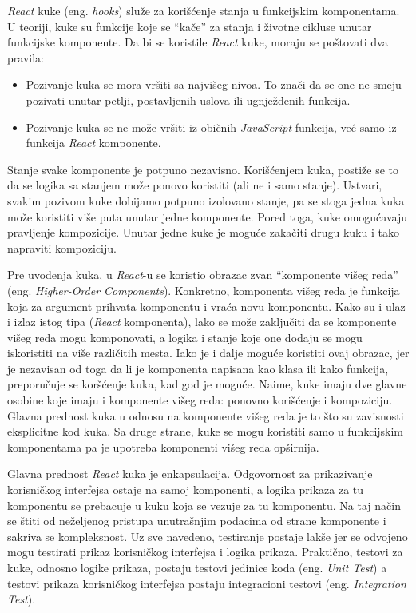 \textit{React} kuke (eng. \textit{hooks}) služe za korišćenje stanja u funkcijskim komponentama. U teoriji, kuke su funkcije 
koje se “kače” za stanja i životne cikluse unutar funkcijske komponente. Da bi se koristile \textit{React} kuke, moraju se 
poštovati dva pravila:
\begin{itemize}
    \item Pozivanje kuka se mora vršiti sa najvišeg nivoa. To znači da se one ne smeju pozivati unutar petlji, 
    postavljenih uslova ili ugnježdenih funkcija.
    \item Pozivanje kuka se ne može vršiti iz običnih \textit{JavaScript} funkcija, već samo iz funkcija \textit{React} komponente.
\end{itemize}

Stanje svake komponente je potpuno nezavisno. Korišćenjem kuka, postiže se to da se logika sa stanjem može ponovo koristiti 
(ali ne i samo stanje). Ustvari, svakim pozivom kuke dobijamo potpuno izolovano stanje, pa se stoga jedna kuka može koristiti 
više puta unutar jedne komponente. Pored toga, kuke omogućavaju pravljenje kompozicije. Unutar jedne kuke je moguće zakačiti 
drugu kuku i tako napraviti kompoziciju. 

Pre uvođenja kuka, u \textit{React}-u se koristio obrazac zvan “komponente višeg reda” (eng. \textit{Higher-Order Components}). 
Konkretno, komponenta višeg reda je funkcija koja za argument prihvata komponentu i vraća novu komponentu. Kako su i ulaz i 
izlaz istog tipa (\textit{React} komponenta), lako se može zaključiti da se komponente višeg reda mogu komponovati, a logika i 
stanje koje one dodaju se mogu iskoristiti na više različitih mesta. Iako je i dalje moguće koristiti ovaj obrazac, jer je 
nezavisan od toga da li je komponenta napisana kao klasa ili kako funkcija, preporučuje se koršćenje kuka, kad god je moguće. 
Naime, kuke imaju dve glavne osobine koje imaju i komponente višeg reda: ponovno korišćenje i kompoziciju. Glavna prednost kuka 
u odnosu na komponente višeg reda je to što su zavisnosti eksplicitne kod kuka. Sa druge strane, kuke se mogu koristiti samo u 
funkcijskim komponentama pa je upotreba komponenti višeg reda opširnija.

Glavna prednost \textit{React} kuka je enkapsulacija. Odgovornost za prikazivanje korisničkog interfejsa ostaje na samoj 
komponenti, a logika prikaza za tu komponentu se prebacuje u kuku koja se vezuje za tu komponentu. Na taj način se štiti 
od neželjenog pristupa unutrašnjim podacima od strane komponente i sakriva se kompleksnost. Uz sve navedeno, 
testiranje postaje lakše jer se odvojeno mogu testirati prikaz korisničkog interfejsa i logika prikaza. Praktično,
testovi za kuke, odnosno logike prikaza, postaju testovi jedinice koda (eng. \textit{Unit Test}) a testovi prikaza
korisničkog interfejsa postaju integracioni testovi (eng. \textit{Integration Test}).

